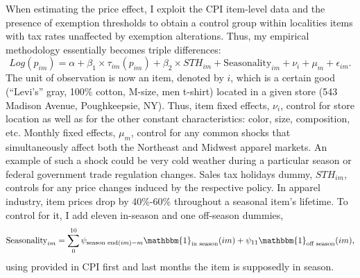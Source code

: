 \documentclass[12pt]{article}
\begin{document}
	When estimating the price effect, I exploit the CPI item-level data and the presence of exemption thresholds to obtain a control group within localities items with tax rates unaffected by exemption alterations. Thus, my empirical methodology essentially becomes triple differences:
	\begin{equation}
	\label{reg:ddd}
	Log(p_{im}) = \alpha+\beta_{1}\times\tau_{im}(p_{im})+\beta_{2}\times STH_{im}+	
	\text{Seasonality}_{im}+\nu_{i}+\mu_{m}+\epsilon_{im}.
	\end{equation} 
	The unit of observation is now an item, denoted by $i$, which is a certain good (``Levi's'' gray, 100\% cotton, M-size, men t-shirt) located in a given store (543 Madison Avenue, Poughkeepsie, NY). 
	Thus, item fixed effects, $\nu_{i}$, control for store location as well as for the other constant characteristics: color, size, composition, etc. %
	Monthly fixed effects, $\mu_{m}$, control for any common shocks that simultaneously affect both the Northeast and Midwest apparel markets. An example of such a shock could be very cold weather during a particular season or federal government trade regulation changes. Sales tax holidays dummy, $STH_{im}$, controls for any price changes induced by the respective policy. In apparel industry, item prices drop by 40\%-60\% throughout a seasonal item's lifetime. To control for it, I add eleven in-season and one off-season dummies,
	\begin{equation}
	\text{Seasonality}_{im}= \sum_{0}^{10}\psi_{\text{season end}(im)-m}\mathbbm{1}_{\text{in season}}(im) + \psi_{11}\mathbbm{1}_{\text{off season}}(im), 
	\end{equation} 
	using provided in CPI first and last months the item is supposedly in season.
	
\end{document}
